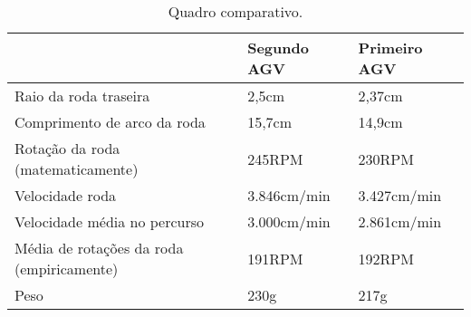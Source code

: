 \begin{table}[htpb]
\caption{Quadro comparativo.}
\label{tab06}
\centering
\begin{tabular}{@{}lll@{}}
\toprule 
  & Segundo AGV & Primeiro AGV \\
\midrule
Raio da roda traseira & 2,5cm & 2,37cm \\
Comprimento de arco da roda & 15,7cm & 14,9cm \\
Rotação da roda (matematicamente) & 245RPM & 230RPM \\
Velocidade roda & 3.846cm/min & 3.427cm/min \\
Velocidade média no percurso & 3.000cm/min & 2.861cm/min \\
Média de rotações da roda (empiricamente) & 191RPM & 192RPM \\
Peso & 230g & 217g \\
\bottomrule
\end{tabular}
\end{table}


